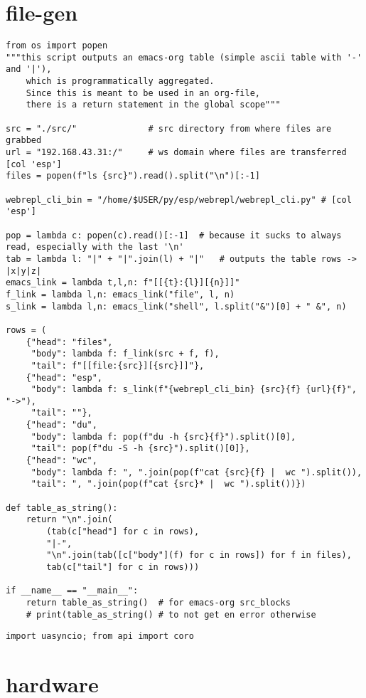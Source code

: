 \documentclass[11pt]{article}
\begin{document}
\section{file-gen}
\label{sec:org601a6e9}
\begin{verbatim}
from os import popen
"""this script outputs an emacs-org table (simple ascii table with '-' and '|'),
    which is programmatically aggregated.
    Since this is meant to be used in an org-file,
    there is a return statement in the global scope"""

src = "./src/"              # src directory from where files are grabbed
url = "192.168.43.31:/"     # ws domain where files are transferred [col 'esp']
files = popen(f"ls {src}").read().split("\n")[:-1]

webrepl_cli_bin = "/home/$USER/py/esp/webrepl/webrepl_cli.py" # [col 'esp']

pop = lambda c: popen(c).read()[:-1]  # because it sucks to always read, especially with the last '\n'
tab = lambda l: "|" + "|".join(l) + "|"   # outputs the table rows -> |x|y|z|
emacs_link = lambda t,l,n: f"[[{t}:{l}][{n}]]"
f_link = lambda l,n: emacs_link("file", l, n)
s_link = lambda l,n: emacs_link("shell", l.split("&")[0] + " &", n)

rows = (
    {"head": "files",
     "body": lambda f: f_link(src + f, f),
     "tail": f"[[file:{src}][{src}]]"},
    {"head": "esp",
     "body": lambda f: s_link(f"{webrepl_cli_bin} {src}{f} {url}{f}", "->"),
     "tail": ""},
    {"head": "du",
     "body": lambda f: pop(f"du -h {src}{f}").split()[0],
     "tail": pop(f"du -S -h {src}").split()[0]},
    {"head": "wc",
     "body": lambda f: ", ".join(pop(f"cat {src}{f} |  wc ").split()),
     "tail": ", ".join(pop(f"cat {src}* |  wc ").split())})

def table_as_string():
    return "\n".join(
        (tab(c["head"] for c in rows),
        "|-",
        "\n".join(tab([c["body"](f) for c in rows]) for f in files),
        tab(c["tail"] for c in rows)))

if __name__ == "__main__":
    return table_as_string()  # for emacs-org src_blocks
    # print(table_as_string() # to not get en error otherwise
\end{verbatim}
\begin{verbatim}
import uasyncio; from api import coro
\end{verbatim}

\section{hardware}
\label{sec:orgd05751d}
\end{document}
